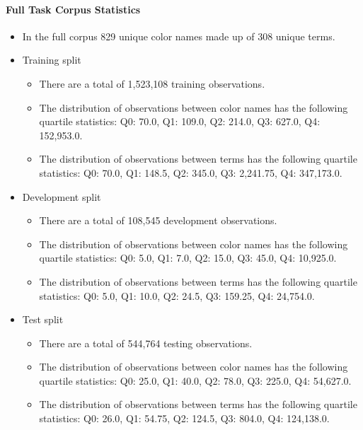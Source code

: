 \documentclass[]{clv3}
\begin{document}
\paragraph{Full Task Corpus Statistics} \label{sec:fulltaskcorpusstats}
\begin{itemize}
	\item In the full corpus 829 unique color names made up of 308 unique terms. 
	
	\item Training split
	\begin{itemize}
		\item There are a total of 1,523,108 training observations.
		\item The distribution of observations between color names has the following quartile statistics: Q0: 70.0, Q1: 109.0, Q2: 214.0, Q3: 627.0, Q4: 152,953.0.
		\item The distribution of observations between terms has the following quartile statistics: Q0: 70.0, Q1: 148.5, Q2: 345.0, Q3: 2,241.75, Q4: 347,173.0.
	\end{itemize}

	\item Development split
	\begin{itemize}
		\item There are a total of 108,545 development observations.
		\item The distribution of observations between color names has the following quartile statistics:  Q0: 5.0, Q1: 7.0, Q2: 15.0, Q3: 45.0, Q4: 10,925.0.
		\item The distribution of observations between terms has the following quartile statistics: Q0: 5.0, Q1: 10.0, Q2: 24.5, Q3: 159.25, Q4: 24,754.0.
	\end{itemize}
	
	\item Test split
	\begin{itemize}
		\item There are a total of 544,764 testing observations.
		\item The distribution of observations between color names has the following quartile statistics:  Q0: 25.0, Q1: 40.0, Q2: 78.0, Q3: 225.0, Q4: 54,627.0.
		\item The distribution of observations between terms has the following quartile statistics: Q0: 26.0, Q1: 54.75, Q2: 124.5, Q3: 804.0, Q4: 124,138.0.
	\end{itemize}
\end{itemize}	
\end{document}
